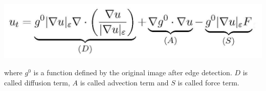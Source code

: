 \begin{center}
\includegraphics{Text/IMG/maca.png}
\end{center}
where $g^{0}$ is a function defined by the original image after edge detection. $D$ is called diffusion term, $A$ is called advection term and $S$ is called force term\cite{macaradek}.


